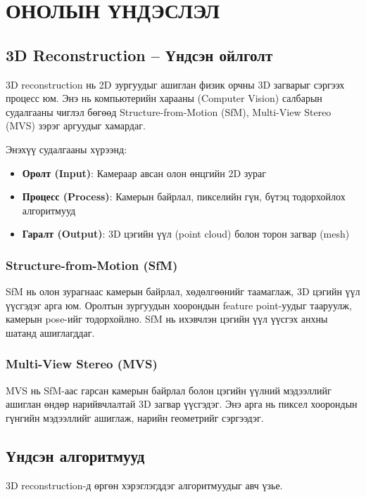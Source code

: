 \chapter{ОНОЛЫН ҮНДЭСЛЭЛ}

\section{3D Reconstruction – Үндсэн ойлголт}

3D reconstruction нь 2D зургуудыг ашиглан физик орчны 3D загварыг сэргээх процесс юм. Энэ нь компьютерийн харааны (Computer Vision) салбарын судалгааны чиглэл бөгөөд Structure-from-Motion (SfM), Multi-View Stereo (MVS) зэрэг аргуудыг хамардаг.

Энэхүү судалгааны хүрээнд:
\begin{itemize}
    \item \textbf{Оролт (Input)}: Камераар авсан олон өнцгийн 2D зураг
    \item \textbf{Процесс (Process)}: Камерын байрлал, пикселийн гүн, бүтэц тодорхойлох алгоритмууд
    \item \textbf{Гаралт (Output)}: 3D цэгийн үүл (point cloud) болон торон загвар (mesh)
\end{itemize}

\subsection{Structure-from-Motion (SfM)}

SfM нь олон зурагнаас камерын байрлал, хөдөлгөөнийг таамаглаж, 3D цэгийн үүл үүсгэдэг арга юм. Оролтын зургуудын хоорондын feature point-уудыг тааруулж, камерын pose-ийг тодорхойлно. SfM нь ихэвчлэн цэгийн үүл үүсгэх анхны шатанд ашиглагддаг.

\subsection{Multi-View Stereo (MVS)}

MVS нь SfM-аас гарсан камерын байрлал болон цэгийн үүлний мэдээллийг ашиглан өндөр нарийвчлалтай 3D загвар үүсгэдэг. Энэ арга нь пиксел хоорондын гүнгийн мэдээллийг ашиглаж, нарийн геометрийг сэргээдэг.

\section{Үндсэн алгоритмууд}

3D reconstruction-д өргөн хэрэглэгддэг алгоритмуудыг авч үзье.

